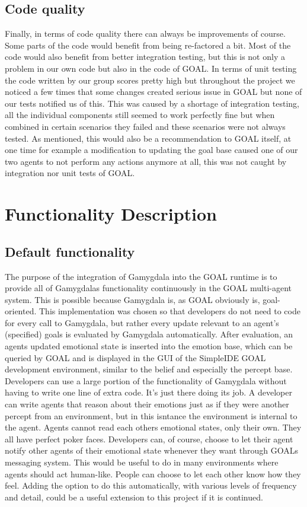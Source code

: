 \documentclass[]{article}
\begin{document}
\subsection{Code quality}
Finally, in terms of code quality there can always be improvements of course. Some parts of the code would benefit from being re-factored a bit. Most of the code would also benefit from better integration testing, but this is not only a problem in our own code but also in the code of GOAL. In terms of unit testing the code written by our group scores pretty high but throughout the project we noticed a few times that some changes created serious issue in GOAL but none of our tests notified us of this. This was caused by a shortage of integration testing, all the individual components still seemed to work perfectly fine but when combined in certain scenarios they failed and these scenarios were not always tested. As mentioned, this would also be a recommendation to GOAL itself, at one time for example a modification to updating the goal base caused one of our two agents to not perform any actions anymore at all, this was not caught by integration nor unit tests of GOAL.

\section{Functionality Description}
\subsection{Default functionality}
The purpose of the integration of Gamygdala into the GOAL runtime is to provide all of Gamygdalas functionality continuously in the GOAL multi-agent system. This is possible because Gamygdala is, as GOAL obviously is, goal-oriented. This implementation was chosen so that developers do not need to code for every call to Gamygdala, but rather every update relevant to an agent's (specified) goals is evaluated by Gamygdala automatically. After evaluation, an agents updated emotional state is inserted into the emotion base, which can be queried by GOAL and is displayed in the GUI of the SimpleIDE GOAL development environment, similar to the belief and especially the percept base. Developers can use a large portion of the functionality of Gamygdala without having to write one line of extra code. It's just there doing its job. A developer can write agents that reason about their emotions just as if they were another percept from an environment, but in this isntance the environment is internal to the agent. Agents cannot read each others emotional states, only their own. They all have perfect poker faces. Developers can, of course, choose to let their agent notify other agents of their emotional state whenever they want through GOALs messaging system. This would be useful to do in many environments where agents should act human-like. People can choose to let each other know how they feel. Adding the option to do this automatically, with various levels of frequency and detail, could be a useful extension to this project if it is continued.
\end{document}
